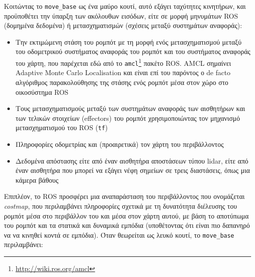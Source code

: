 Κοιτώντας το \texttt{move\_base} ως ένα μαύρο κουτί, αυτό εξάγει ταχύτητες
κινητήρων, και προϋποθέτει την ύπαρξη των ακόλουθων εισόδων, είτε σε μορφή
μηνυμάτων ROS (δομημένα δεδομένα) ή μετασχηματισμών (σχέσεις μεταξύ συστημάτων
αναφοράς):

\begin{itemize}
  \item Την εκτιμώμενη στάση του ρομπότ με τη μορφή ενός μετασχηματισμού μεταξύ
        του οδομετρικού συστήματος αναφοράς του ρομπότ και του συστήματος
        αναφοράς του χάρτη, που παρέχεται εδώ από το
        \texttt{amcl}\footnote{\url{http://wiki.ros.org/amcl}} πακέτο ROS.
        AMCL σημαίνει Adaptive Monte Carlo Localisation \cite{amcl}
        και είναι επί του παρόντος ο de facto αλγόριθμος παρακολούθησης της
        στάσης ενός ρομπότ μέσα στον χώρο στο οικοσύστημα ROS
  \item Τους μετασχηματισμούς μεταξύ των συστημάτων αναφοράς
        των αισθητήρων και των τελικών στοιχείων (effectors) του ρομπότ
        χρησιμοποιώντας τον μηχανισμό μετασχηματισμού του ROS (\texttt{tf})
  \item Πληροφορίες οδομετρίας και (προαιρετικά) τον χάρτη του περιβάλλοντος
  \item Δεδομένα απόστασης είτε από έναν αισθητήρα αποστάσεων τύπου lidar, είτε
        από έναν αισθητήρα που μπορεί να εξάγει νέφη σημείων σε τρεις
        διαστάσεις, όπως μια κάμερα βάθους
\end{itemize}

Επιπλέον, το ROS προσφέρει μια αναπαράσταση του περιβάλλοντος που ονομάζεται
\textit{costmap}, που περιλαμβάνει πληροφορίες σχετικά με τη δυνατότητα
διέλευσης του ρομπότ μέσα στο περιβάλλον του και μέσα στον χάρτη αυτού, με βάση
το αποτύπωμα του ρομπότ και τα στατικά και δυναμικά εμπόδια (υποθέτοντας ότι
είναι πιο δαπανηρό να να κινηθεί κοντά σε εμπόδια). Όταν θεωρείται ως λευκό
κουτί, το \texttt{move\_base} περιλαμβάνει:

